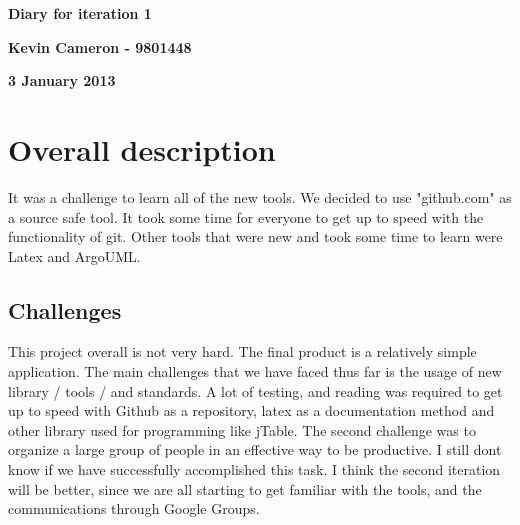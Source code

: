 \documentclass[12pt]{article}
\begin{document}
\vspace*{0.5in}
\centerline{\bf\Large Diary for iteration 1}

\vspace*{0.5in}
\centerline{\bf\Large Kevin Cameron - 9801448}

\vspace*{0.5in}
\centerline{\bf\Large 3 January 2013}

\clearpage

\section{Overall description}
It was a challenge to learn all of the new tools. We decided to use "github.com" as a source safe tool. It took some time for everyone to get up to speed with the functionality of git. Other tools that were new and took some time to learn were Latex and ArgoUML.
\subsection{Challenges}
This project overall is not very hard. The final product is a relatively simple application. The main challenges that we have faced thus far is the usage of new library / tools / and standards. A lot of testing, and reading was required to get up to speed with Github as a repository, latex as a documentation method and other library used for programming like jTable. 
The second challenge was to organize a large group of people in an effective way to be productive. I still dont know if we have successfully accomplished this task. I think the second iteration will be better, since we are all starting to get familiar with the tools, and the communications through Google Groups.
\end{document}
